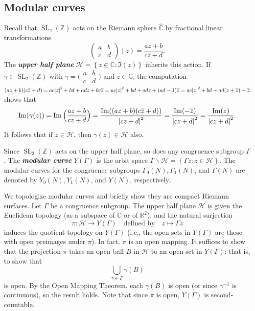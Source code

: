 \documentclass[10pt,leqno]{article}
\theoremstyle{plain}
\theoremstyle{definition}
\numberwithin{equation}{section}
\numberwithin{lem}{section}
\newcommand{\cbr}[1]{\left\{#1\right\}}
\newcommand{\textib}[1]{\textbf{\textit{#1}}}
\DeclareMathOperator{\SL}{SL}
\begin{document}
\subsection{Modular curves}
Recall that $\SL_2(\mathbb{Z})$ acts on the Riemann sphere $\widehat{\mathbb{C}}$ by fractional linear transformations \[\begin{pmatrix}
    a & b \\ c & d
\end{pmatrix}(z) = \frac{az + b}{cz+d}.\] The \textib{upper half plane} $\mathcal{H} = \cbr{z\in\mathbb{C} : \Im(z)}$ inherits this action. If $\gamma\in \SL_2(\mathbb{Z})$ with $\gamma = \big(\!\begin{smallmatrix}
    a & b \\ c & d
\end{smallmatrix}\!\big)$ and $z\in \mathbb C$, the computation $(az+b)(c\overline z + d) = ac\abs{z}^2+bd + adz + bc\overline z = ac\abs{z}^2+bd + adz + (ad-1)\overline z = ac\abs{z}^2+bd + ad(z+\overline z) -\overline z$ shows that
\begin{equation}\label{eq: imaginary parts}
    \Im(\gamma(z)) = \Im\Big(\frac{az+b}{cz+d}\Big) = \frac{\Im((az+b)(c\overline z + d))}{\abs{cz+d}^2} = \frac{\Im(-\overline z)}{\abs{cz+d}^2} = \frac{\Im(z)}{\abs{cz+d}^2}.
\end{equation}
It follows that if $z\in \mathcal{H}$, then $\gamma(z)\in \mathcal{H}$ also.

Since $\SL_2(\mathbb{Z})$ acts on the upper half plane, so does any congruence subgroup $\varGamma$. The \textib{modular curve} $Y(\varGamma)$ is the orbit space $\varGamma\backslash \mathcal{H} = \cbr{\varGamma z : z\in\mathcal H}$. The modular curves for the congruence subgroups $\varGamma_0(N), \varGamma_1(N)$, and $\varGamma(N)$ are denoted by $Y_0(N), Y_1(N)$, and $Y(N)$, respectively.

We topologize modular curves and briefly show they are compact Riemann surfaces. Let $\varGamma$ be a congruence subgroup. The upper half plane $\mathcal H$ is given the Euclidean topology (as a subspace of $\mathbb{C}$ or of $\mathbb{R}^2$), and the natural surjection \[\pi \colon \mathcal H \to Y(\varGamma)\quad \text{defined by}\quad  z\mapsto \varGamma z\] induces the quotient topology on $Y(\varGamma)$ (i.e., the open sets in $Y(\varGamma)$ are those with open preimages under $\pi$). In fact, $\pi$ is an open mapping. It suffices to show that the projection $\pi$ takes an open ball $B$ in $\mathcal{H}$ to an open set in $Y(\varGamma)$; that is, to show that \[\bigcup_{\gamma\in \varGamma}\gamma(B)\] is open. By the Open Mapping Theorem, each $\gamma(B)$ is open (or since $\gamma^{-1}$ is continuous), so the result holds. Note that since $\pi$ is open, $Y(\varGamma)$ is second-countable.
\end{document}
